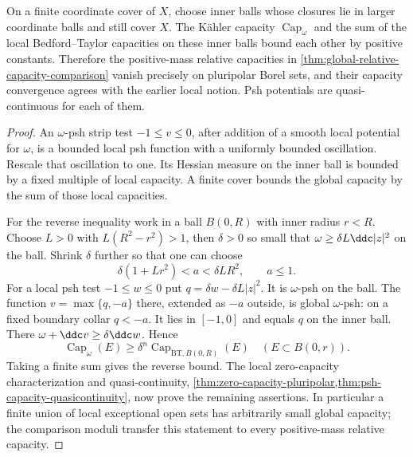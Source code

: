 \begin{proposition}\label{prop:global-local-capacity-equivalence}
On a finite coordinate cover of $X$, choose inner balls whose closures lie in larger coordinate balls and still cover $X$. The K\"ahler capacity $\operatorname{Cap}_\omega$ and the sum of the local Bedford--Taylor capacities on these inner balls bound each other by positive constants. Therefore the positive-mass relative capacities in \cref{thm:global-relative-capacity-comparison} vanish precisely on pluripolar Borel sets, and their capacity convergence agrees with the earlier local notion. Psh potentials are quasi-continuous for each of them.
\end{proposition}
\begin{proof}
An $\omega$-psh strip test $-1\leq v\leq0$, after addition of a smooth local potential for $\omega$, is a bounded local psh function with a uniformly bounded oscillation. Rescale that oscillation to one. Its Hessian measure on the inner ball is bounded by a fixed multiple of local capacity. A finite cover bounds the global capacity by the sum of those local capacities.

For the reverse inequality work in a ball $B(0,R)$ with inner radius $r<R$. Choose $L>0$ with $L(R^2-r^2)>1$, then $\delta>0$ so small that $\omega\geq\delta L\ddc|z|^2$ on the ball. Shrink $\delta$ further so that one can choose
\[
 \delta(1+Lr^2)<a<\delta LR^2,\qquad a\leq1.
\]
For a local psh test $-1\leq w\leq0$ put $q=\delta w-\delta L|z|^2$. It is $\omega$-psh on the ball. The function $v=\max\{q,-a\}$ there, extended as $-a$ outside, is global $\omega$-psh: on a fixed boundary collar $q<-a$. It lies in $[-1,0]$ and equals $q$ on the inner ball. There $\omega+\ddc v\geq\delta\ddc w$. Hence
\[
 \operatorname{Cap}_\omega(E)\geq\delta^n
                 \operatorname{Cap}_{\mathrm{BT},B(0,R)}(E)
                   \quad(E\subset B(0,r)).
\]
Taking a finite sum gives the reverse bound. The local zero-capacity characterization and quasi-continuity, \cref{thm:zero-capacity-pluripolar,thm:psh-capacity-quasicontinuity}, now prove the remaining assertions. In particular a finite union of local exceptional open sets has arbitrarily small global capacity; the comparison moduli transfer this statement to every positive-mass relative capacity.
\end{proof}
